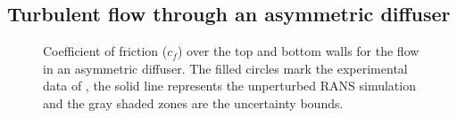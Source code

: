 \subsection{Turbulent flow through an asymmetric diffuser}

\begin{figure}
\centering
{}
\caption{Coefficient of friction ($c_f$) over the top and bottom walls for the flow in an asymmetric diffuser. The filled circles mark the experimental data of \cite{buice}, the solid line represents the unperturbed RANS simulation and the gray shaded zones are the uncertainty bounds.\label{fig:diffuser_cf}}
\end{figure}

